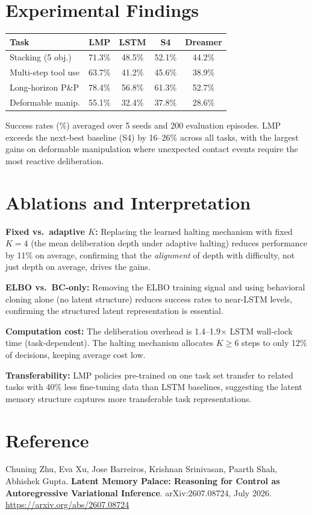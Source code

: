\documentclass[10pt,twocolumn]{article}
\begin{document}
\section{Experimental Findings}

\begin{center}
\small
\begin{tabular}{lcccc}
\toprule
\textbf{Task} & \textbf{LMP} & \textbf{LSTM} & \textbf{S4} & \textbf{Dreamer} \\
\midrule
Stacking (5 obj.)   & 71.3\% & 48.5\% & 52.1\% & 44.2\% \\
Multi-step tool use & 63.7\% & 41.2\% & 45.6\% & 38.9\% \\
Long-horizon P\&P   & 78.4\% & 56.8\% & 61.3\% & 52.7\% \\
Deformable manip.   & 55.1\% & 32.4\% & 37.8\% & 28.6\% \\
\bottomrule
\end{tabular}
\end{center}

Success rates (\%) averaged over 5 seeds and 200 evaluation episodes.
LMP exceeds the next-best baseline (S4) by 16--26\% across all tasks,
with the largest gains on deformable manipulation where unexpected
contact events require the most reactive deliberation.

\section{Ablations and Interpretation}

\textbf{Fixed vs.\ adaptive $K$:} Replacing the learned halting mechanism
with fixed $K = 4$ (the mean deliberation depth under adaptive halting)
reduces performance by 11\% on average, confirming that the \emph{alignment}
of depth with difficulty, not just depth on average, drives the gains.

\textbf{ELBO vs.\ BC-only:} Removing the ELBO training signal and
using behavioral cloning alone (no latent structure) reduces success
rates to near-LSTM levels, confirming the structured latent representation
is essential.

\textbf{Computation cost:} The deliberation overhead is 1.4--1.9$\times$
LSTM wall-clock time (task-dependent). The halting mechanism allocates
$K \geq 6$ steps to only 12\% of decisions, keeping average cost low.

\textbf{Transferability:} LMP policies pre-trained on one task set
transfer to related tasks with 40\% less fine-tuning data than LSTM
baselines, suggesting the latent memory structure captures more
transferable task representations.

\section*{Reference}

Chuning Zhu, Eva Xu, Jose Barreiros, Krishnan Srinivasan, Paarth Shah,
Abhishek Gupta.
\textbf{Latent Memory Palace: Reasoning for Control as Autoregressive
Variational Inference}.
arXiv:2607.08724, July 2026.
\url{https://arxiv.org/abs/2607.08724}
\end{document}
